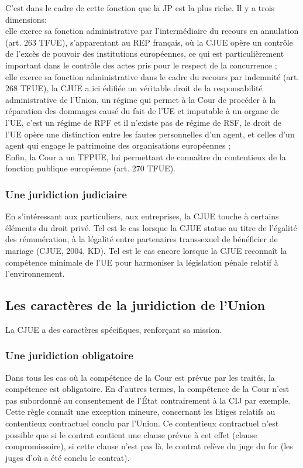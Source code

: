 \documentclass[10pt, a4paper, openany]{book}
\begin{document}
C'est dans le cadre de cette fonction que la JP est la plus riche. Il y a trois dimensions: \\
elle exerce sa fonction administrative par l'intermédiaire du recours en annulation (art. 263 TFUE), s'apparentant au REP français, où la CJUE opère un contrôle de l'excès de pouvoir des institutions européennes, ce qui est particulièrement important dans le contrôle des actes pris pour le respect de la concurrence ; \\
elle exerce sa fonction administrative dans le cadre du recours par indemnité (art. 268 TFUE), la CJUE a ici édifiée un véritable droit de la responsabilité administrative de l'Union, un régime qui permet à la Cour de procéder à la réparation des dommages causé du fait de l'UE et imputable à un organe de l'UE, c'est un régime de RPF et il n'existe pas de régime de RSF, le droit de l'UE opère une distinction entre les fautes personnelles d'un agent, et celles d'un agent qui engage le patrimoine des organisations européennes ; \\
Enfin, la Cour a un TFPUE, lui permettant de connaître du contentieux de la fonction publique européenne (art. 270 TFUE).

\subsubsection{Une juridiction judiciaire}

En s'intéressant aux particuliers, aux entreprises, la CJUE touche à certains éléments du droit privé. Tel est le cas lorsque la CJUE statue au titre de l'égalité des rémunération, à la légalité entre partenaires transsexuel de bénéficier de mariage (CJUE, 2004, KD). Tel est le cas encore lorsque la CJUE reconnaît la compétence minimale de l'UE pour harmoniser la législation pénale relatif à l'environnement. 

\subsection{Les caractères de la juridiction de l'Union}

La CJUE a des caractères spécifiques, renforçant sa mission.

\subsubsection{Une juridiction obligatoire}

Dans tous les cas où la compétence de la Cour est prévue par les traités, la compétence est obligatoire. En d'autres termes, la compétence de la Cour n'est pas subordonné au consentement de l'État contrairement à la CIJ par exemple. Cette règle connaît une exception mineure, concernant les litiges relatifs au contentieux contractuel conclu par l'Union. Ce contentieux contractuel n'est possible que si le contrat contient une clause prévue à cet effet (clause compromissoire), si cette clause n'est pas là, le contrat relève du juge du for (les juges d'où a été conclu le contrat). 
\end{document}
